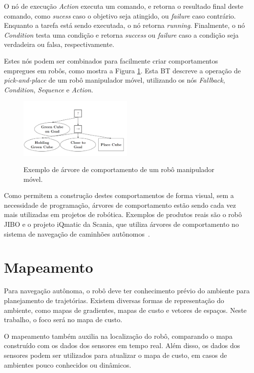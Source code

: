 \documentclass[repeatfields,xlists,xpacks,oneside,yearsonly]{ufrgscca}
\begin{document}
O nó de execução \textit{Action} executa um comando, e retorna o resultado final deste comando,
como \textit{sucess} caso o objetivo seja atingido, ou \textit{failure} caso contrário.
Enquanto a tarefa está sendo executada, o nó retorna \textit{running}.
Finalmente, o nó \textit{Condition} testa uma condição e retorna \textit{success} ou \textit{failure}
caso a condição	seja verdadeira ou falsa, respectivamente.

Estes nós podem ser combinados para facilmente criar comportamentos
empregues em robôs, como mostra a Figura \ref{fig:bt_exemplo}.
Esta BT descreve a operação de \textit{pick-and-place} de um robô manipulador móvel,
utilizando os nós \textit{Fallback}, \textit{Condition},
\textit{Sequence} e \textit{Action}.

\begin{figure}[htbp]
    {
        \centering
        \caption{Exemplo de árvore de comportamento de um robô manipulador móvel.}
        \label{fig:bt_exemplo}
        \includegraphics[width=0.5\textwidth]{bt_exemplo.png}\\
    }
    {}
\end{figure}

Como permitem a construção destes comportamentos de forma visual, sem a
necessidade de programação, árvores de comportamento estão sendo cada
vez mais utilizadas em projetos de robótica. Exemplos de produtos
reais são o robô JIBO e o projeto iQmatic da Scania, que
utiliza árvores de comportamento no sistema de navegação de caminhões
autônomos~\cite{BehaviorTree}.

\section{Mapeamento}

Para navegação autônoma, o robô deve ter conhecimento prévio do ambiente
para planejamento de trajetórias.
Existem diversas formas de representação do ambiente,
como mapas de gradientes, mapas de custo e vetores de espaços.
Neste trabalho, o foco será no mapa de custo.

O mapeamento também auxilia na localização do robô, comparando o mapa construído
com os dados dos sensores em tempo real. Além disso, os dados dos sensores podem ser
utilizados para atualizar o mapa de custo, em casos de ambientes pouco conhecidos ou dinâmicos.
\end{document}
